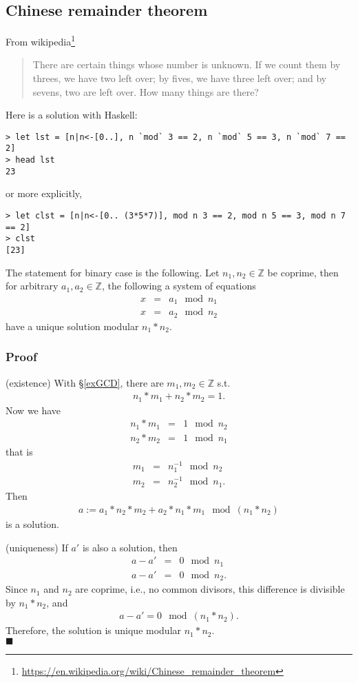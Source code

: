 \documentclass[11pt]{book}
\begin{document}
\subsection{Chinese remainder theorem}
From wikipedia\footnote{
\url{https://en.wikipedia.org/wiki/Chinese_remainder_theorem}
}
\begin{quotation}
There are certain things whose number is unknown. If we count them by threes, we have two left over; by fives, we have three left over; and by sevens, two are left over. How many things are there? 
\end{quotation}
Here is a solution with Haskell:
\begin{verbatim}
> let lst = [n|n<-[0..], n `mod` 3 == 2, n `mod` 5 == 3, n `mod` 7 == 2]
> head lst
23
\end{verbatim}
or more explicitly,
\begin{verbatim}
> let clst = [n|n<-[0.. (3*5*7)], mod n 3 == 2, mod n 5 == 3, mod n 7 == 2]
> clst 
[23]
\end{verbatim}

The statement for binary case is the following.
Let $n_1, n_2 \in \mathbb{Z}$ be coprime, then for arbitrary $a_1,a_2 \in \mathbb{Z}$, the following a system of equations
\begin{eqnarray}
x &=& a_1 \mod n_1\\
x &=& a_2 \mod n_2
\end{eqnarray}
have a unique solution modular $n_1*n_2$.

\subsubsection{Proof}
(existence) With \S\ref{exGCD}, there are $m_1,m_2 \in \mathbb{Z}$ s.t.
\begin{eqnarray}
n_1 * m_1 + n_2 * m_2 = 1.
\end{eqnarray}
Now we have
\begin{eqnarray}
n_1 * m_1 &=& 1 \mod n_2 \\
n_2 * m_2 &=& 1 \mod n_1
\end{eqnarray}
that is
\begin{eqnarray}
m_1 &=& n_1^{-1} \mod n_2 \\
m_2 &=& n_2^{-1} \mod n_1.
\end{eqnarray}
Then
\begin{eqnarray}
a := a_1 * n_2 * m_2 + a_2 * n_1 * m_1 \mod (n_1*n_2)
\end{eqnarray}
is a solution.

(uniqueness)
If $a'$ is also a solution, then
\begin{eqnarray}
a - a' &=& 0 \mod n_1 \\
a - a' &=& 0 \mod n_2.
\end{eqnarray}
Since $n_1$ and $n_2$ are coprime, i.e., no common divisors, this difference is divisible by $n_1*n_2$, and
\begin{eqnarray}
a - a' = 0 \mod (n_1 * n_2).
\end{eqnarray}
Therefore, the solution is unique modular $n_1*n_2$. \\
$\blacksquare$
\end{document}
